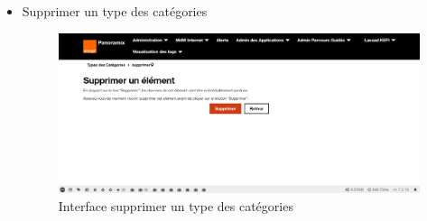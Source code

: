 \begin{itemize}
	\item Supprimer un type des catégories
	\begin{figure}[H]
		\centering
		\includegraphics[width=0.7\linewidth]{img/screenshots/categorie-type/delete}
		\caption[Interface supprimer un type des catégories]{Interface supprimer un type des catégories}
		\label{fig:delete-tc}
	\end{figure}
\end{itemize}
\newpage
